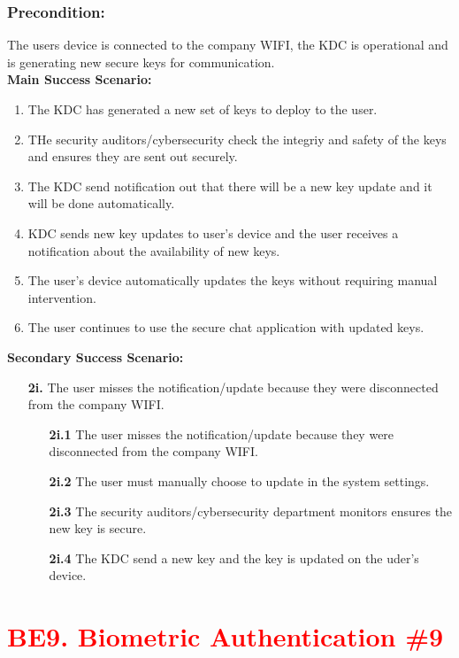 \documentclass[]{article}
\begin{document}
\subsubsection*{Precondition:} The users device is connected to the company WIFI, the KDC is operational and is generating new secure keys for communication.\\
\textbf{Main Success Scenario:}
\begin{enumerate}
	\item The KDC has generated a new set of keys to deploy to the user.
	\item THe security auditors/cybersecurity check the integriy and safety of the keys and ensures they are sent out securely.
	\item The KDC send notification out that there will be a new key update and it will be done automatically.
	\item KDC sends new key updates to user’s device and the user receives a notification about the availability of new keys.
	\item The user's device automatically updates the keys without requiring manual intervention.
	\item The user continues to use the secure chat application with updated keys.
\end{enumerate}
\textbf{Secondary Success Scenario:}
\begin{enumerate}
	\item[\textbf{2i.}] The user misses the notification/update because they were disconnected from the company WIFI.
		\begin{enumerate}
			\item[\textbf{2i.1}] The user misses the notification/update because they were disconnected from the company WIFI.
			\item[\textbf{2i.2}] The user must manually choose to update in the system settings.
			\item[\textbf{2i.3}] The security auditors/cybersecurity department monitors ensures the new key is secure.
			\item[\textbf{2i.4}] The KDC send a new key and the key is updated on the uder's device.
		\end{enumerate}
\end{enumerate}

\section*{\textcolor{red}{BE9. Biometric Authentication \#9}}
\end{document}
